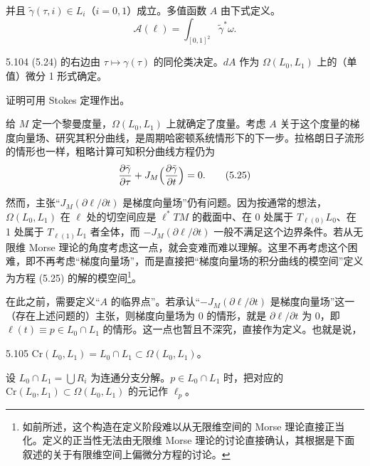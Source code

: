 并且 $\tilde\gamma(\tau,i)\in L_i$（$i=0,1$）成立。多值函数 $A$ 由下式定义。
\begin{equation}
  \mathcal{A}(\ell)=\int_{[0,1]^2}\tilde\gamma^*\omega . \tag{5.24}
\end{equation}

\begin{lemma}{5.104}
  (5.24) 的右边由 $\tau\mapsto\gamma(\tau)$ 的同伦类决定。$dA$ 作为 $\Omega(L_0,L_1)$ 上的（单值）微分 1 形式确定。
\end{lemma}

证明可用 Stokes 定理作出。

给 $M$ 定一个黎曼度量，$\Omega(L_0,L_1)$ 上就确定了度量。考虑 $A$ 关于这个度量的梯度向量场、研究其积分曲线，是周期哈密顿系统情形下的下一步。拉格朗日子流形的情形也一样，粗略计算可知积分曲线方程仍为
\begin{equation}
  \frac{\partial\tilde\gamma}{\partial\tau}+J_M\Bigl(\frac{\partial\tilde\gamma}{\partial t}\Bigr)=0 . \tag{5.25}
\end{equation}

然而，主张“$J_M(\partial\ell/\partial t)$ 是梯度向量场”仍有问题。因为按通常的想法，$\Omega(L_0,L_1)$ 在 $\ell$ 处的切空间应是 $\ell^*TM$ 的截面中、在 0 处属于 $T_{\ell(0)}L_0$、在 1 处属于 $T_{\ell(1)}L_1$ 者全体，而 $-J_M(\partial\ell/\partial t)$ 一般不满足这个边界条件。若从无限维 Morse 理论的角度考虑这一点，就会变难而难以理解。这里不再考虑这个困难，即不再考虑“梯度向量场”，而是直接把“梯度向量场的积分曲线的模空间”定义为方程 (5.25) 的解的模空间\footnote{如前所述，这个构造在定义阶段难以从无限维空间的 Morse 理论直接正当化。定义的正当性无法由无限维 Morse 理论的讨论直接确认，其根据是下面叙述的关于有限维空间上偏微分方程的讨论。}。

在此之前，需要定义“$A$ 的临界点”。若承认“$-J_M(\partial\ell/\partial t)$ 是梯度向量场”这一（存在上述问题的）主张，则梯度向量场为 0 的情形，就是 $\partial\ell/\partial t$ 为 0，即 $\ell(t)\equiv p\in L_0\cap L_1$ 的情形。这一点也暂且不深究，直接作为定义。也就是说，

\begin{definition}{5.105}
  $\mathrm{Cr}(L_0,L_1)=L_0\cap L_1\subset\Omega(L_0,L_1)$。
\end{definition}

设 $L_0\cap L_1=\bigcup R_i$ 为连通分支分解。$p\in L_0\cap L_1$ 时，把对应的 $\mathrm{Cr}(L_0,L_1)\subset\Omega(L_0,L_1)$ 的元记作 $\ell_p$。

